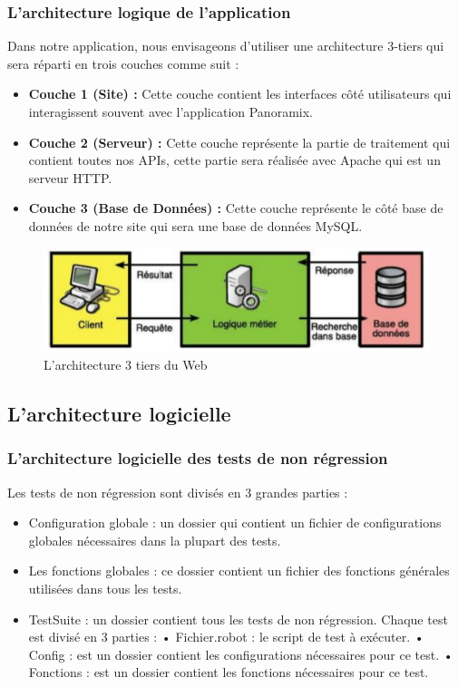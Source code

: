 \subsubsection{L'architecture logique de l’application}
Dans notre application, nous envisageons d’utiliser une architecture 3-tiers qui sera réparti en trois couches comme suit :
\begin{itemize}
	\item\textbf{ Couche 1 (Site) :} Cette couche contient les interfaces côté utilisateurs qui interagissent souvent avec l’application Panoramix.
	\item\textbf{ Couche 2 (Serveur) : }Cette couche représente la partie de traitement qui contient toutes nos APIs, cette partie sera réalisée avec Apache qui est un serveur HTTP.
	\item \textbf{Couche 3 (Base de Données) :} Cette couche représente le côté base de données de notre site qui sera une base de données MySQL.
\end{itemize}
\begin{figure}[H]
	\centering
	\includegraphics[width=0.7\linewidth]{img/architectures-3tiers-web}
	\caption[L'architectures 3 tiers du Web]{L'architecture 3 tiers du Web}
	\label{fig:architectures-3tiers-web}
\end{figure}

\subsection[L'architecture logicielle]{L'architecture logicielle}
\subsubsection{L'architecture logicielle des tests de non régression}
Les tests de non régression sont divisés en 3 grandes parties :
\begin{itemize}
	\item Configuration globale : un dossier qui contient un fichier de configurations globales nécessaires dans la plupart des tests.
	\item Les fonctions globales : ce dossier contient un fichier des fonctions générales utilisées dans tous les tests.
	\item TestSuite : un dossier contient tous les tests de non régression. Chaque test est divisé en 3 parties :
		\subitem • Fichier.robot : le script de test à exécuter.
		\subitem • Config : est un dossier contient les configurations nécessaires pour ce test.
		\subitem • Fonctions : est un dossier contient les fonctions nécessaires pour ce test.
\end{itemize}
